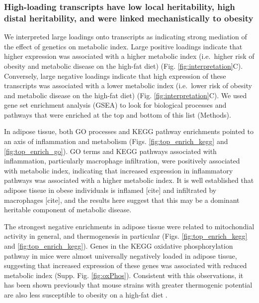 \documentclass[
]{article}
\begin{document}
\subsubsection{High-loading transcripts have low local heritability,
high distal heritability, and were linked mechanistically to
obesity}\label{high-loading-transcripts-have-low-local-heritability-high-distal-heritability-and-were-linked-mechanistically-to-obesity}

We interpreted large loadings onto transcripts as indicating strong
mediation of the effect of genetics on metabolic index. Large positive
loadings indicate that higher expression was associated with a higher
metabolic index (i.e.~higher risk of obesity and metabolic disease on
the high-fat diet) (Fig. \ref{fig:interpretation}C). Conversely, large
negative loadings indicate that high expression of these transcripts was
associated with a lower metabolic index (i.e.~lower risk of obesity and
metabolic disease on the high-fat diet) (Fig.
\ref{fig:interpretation}C). We used gene set enrichment analysis (GSEA)
\cite{fgsea, 
pmid16199517} to look for biological processes and pathways that were
enriched at the top and bottom of this list (Methods).

In adipose tissue, both GO processes and KEGG pathway enrichments
pointed to an axis of inflammation and metabolism (Figs.
\ref{fig:top_enrich_kegg} and \ref{fig:top_enrich_go}). GO terms and
KEGG pathways associated with inflammation, particularly macrophage
infiltration, were positively associated with metabolic index,
indicating that increased expression in inflammatory pathways was
associated with a higher metabolic index. It is well established that
adipose tissue in obese individuals is inflamed {[}cite{]} and
infiltrated by macrophages {[}cite{]}, and the results here suggest that
this may be a dominant heritable component of metabolic disease.

The strongest negative enrichments in adipose tissue were related to
mitochondial activity in general, and thermogenesis in particular (Figs.
\ref{fig:top_enrich_kegg} and \ref{fig:top_enrich_kegg}). Genes in the
KEGG oxidative phosphorylation pathway in mice were almost universally
negatively loaded in adipose tissue, suggesting that increased
expression of these genes was associated with reduced metabolic index
(Supp. Fig. \ref{fig:oxPhos}). Consistent with this observations, it has
been shown previously that mouse strains with greater thermogenic
potential are also less susceptible to obesity on a high-fat diet
\cite{pmid18492779}.
\end{document}
